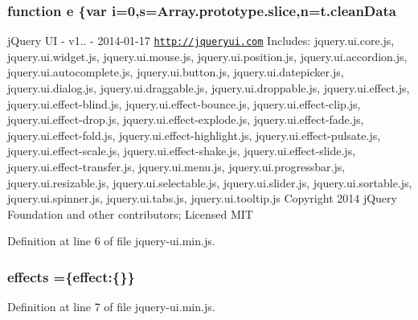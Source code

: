 {{\subsubsection[{\texorpdfstring{e}{e}}]{\setlength{\rightskip}{0pt plus 5cm}function e \{var {\bf i}=0,{\bf s}=Array.\+prototype.\+slice,{\bf n}={\bf t.\+clean\+Data}}\hypertarget{jquery-ui_8min_8js_a2c038346d47955cbe2cb91e338edd7e1}{}\label{jquery-ui_8min_8js_a2c038346d47955cbe2cb91e338edd7e1}
j\+Query UI -\/ v1.. -\/ 2014-\/01-\/17 \href{http://jqueryui.com}{\tt http\+://jqueryui.\+com} Includes\+: jquery.\+ui.\+core.\+js, jquery.\+ui.\+widget.\+js, jquery.\+ui.\+mouse.\+js, jquery.\+ui.\+position.\+js, jquery.\+ui.\+accordion.\+js, jquery.\+ui.\+autocomplete.\+js, jquery.\+ui.\+button.\+js, jquery.\+ui.\+datepicker.\+js, jquery.\+ui.\+dialog.\+js, jquery.\+ui.\+draggable.\+js, jquery.\+ui.\+droppable.\+js, jquery.\+ui.\+effect.\+js, jquery.\+ui.\+effect-\/blind.\+js, jquery.\+ui.\+effect-\/bounce.\+js, jquery.\+ui.\+effect-\/clip.\+js, jquery.\+ui.\+effect-\/drop.\+js, jquery.\+ui.\+effect-\/explode.\+js, jquery.\+ui.\+effect-\/fade.\+js, jquery.\+ui.\+effect-\/fold.\+js, jquery.\+ui.\+effect-\/highlight.\+js, jquery.\+ui.\+effect-\/pulsate.\+js, jquery.\+ui.\+effect-\/scale.\+js, jquery.\+ui.\+effect-\/shake.\+js, jquery.\+ui.\+effect-\/slide.\+js, jquery.\+ui.\+effect-\/transfer.\+js, jquery.\+ui.\+menu.\+js, jquery.\+ui.\+progressbar.\+js, jquery.\+ui.\+resizable.\+js, jquery.\+ui.\+selectable.\+js, jquery.\+ui.\+slider.\+js, jquery.\+ui.\+sortable.\+js, jquery.\+ui.\+spinner.\+js, jquery.\+ui.\+tabs.\+js, jquery.\+ui.\+tooltip.\+js Copyright 2014 j\+Query Foundation and other contributors; Licensed M\+IT 

Definition at line 6 of file jquery-\/ui.\+min.\+js.

\subsubsection[{\texorpdfstring{effects}{effects}}]{ effects =\{effect\+:\{\}\}}\hypertarget{jquery-ui_8min_8js_a2a2e3c94407e52bf9604b84c4f7ae43c}{}\label{jquery-ui_8min_8js_a2a2e3c94407e52bf9604b84c4f7ae43c}


Definition at line 7 of file jquery-\/ui.\+min.\+js.

}}
